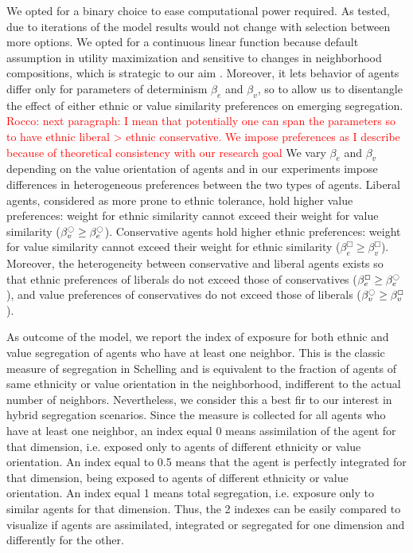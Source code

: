 \documentclass{article}
\newcommand{\rocco}[1]{{\textcolor{red}{Rocco: #1}}} %
\begin{document}
We opted for a binary choice to ease computational power required. As tested, due to iterations of the model results would not change with selection between more options. We opted for a continuous linear function because default assumption in utility maximization and sensitive to changes in neighborhood compositions, which is strategic to our aim \autocite{van2009neighborhood}. Moreover, it lets behavior of agents differ only for parameters of determinism $\beta_e$ and $\beta_v$, so to allow us to disentangle the effect of either ethnic or value similarity preferences on emerging segregation. \rocco{next paragraph: I mean that potentially one can span the parameters so to have ethnic liberal > ethnic conservative. We impose preferences as I describe because of theoretical consistency with our research goal} We vary $\beta_e$ and $\beta_v$ depending on the value orientation of agents and in our experiments impose differences in heterogeneous preferences between the two types of agents. Liberal agents, considered as more  prone to ethnic tolerance, hold higher value preferences: weight for ethnic similarity cannot exceed their weight for value similarity ($\beta^{\ocircle}_v \geq \beta^{\ocircle}_e$). Conservative agents hold higher ethnic preferences: weight for value similarity cannot exceed their weight for  ethnic similarity ($\beta^{\Box}_e \geq \beta^{\Box}_v$). Moreover, the heterogeneity between conservative and liberal agents exists so that ethnic preferences of liberals do not exceed those of conservatives ($\beta^{\Box}_e \geq \beta^{\ocircle}_e$), and value preferences of conservatives do not exceed those of liberals ($\beta^{\ocircle}_v \geq \beta^{\Box}_v$).

As outcome of the model, we report the index of exposure for both ethnic and value segregation of agents who have at least one neighbor. This is the classic measure of segregation in Schelling and is equivalent to the fraction of agents of same ethnicity or value orientation in the neighborhood, indifferent to the actual number of neighbors. Nevertheless, we consider this a best fir to our interest in hybrid segregation scenarios. Since the measure is collected for all agents who have at least one neighbor, an index equal 0 means assimilation of the agent for that dimension, i.e. exposed only to agents of different ethnicity or value orientation. An index equal to 0.5 means that the agent is perfectly integrated for that dimension, being exposed to agents of different ethnicity or value orientation. An index equal 1 means total segregation, i.e. exposure only to similar agents for that dimension. Thus, the 2 indexes can be easily compared to visualize if agents are assimilated, integrated or segregated for one dimension and differently for the other.
\end{document}
